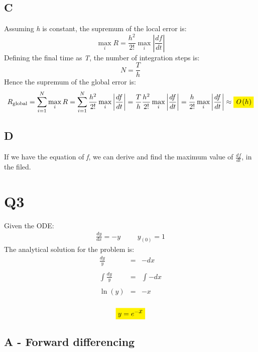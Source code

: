 \documentclass[11pt, a4paper]{article}
\begin{document}
\subsection{C}
Assuming \emph{h} is constant, the supremum of the local error is:
\begin{equation*}
    \max_i{R}=\frac{h^2}{2!}\max_i{\left|\frac{df}{dt}\right|}
\end{equation*}
Defining the final time as \emph{T}, the number of integration steps is:
\begin{equation}
    N=\frac{T}{h}
\end{equation}
Hence the supremum of the global error is:
\begin{equation}
    R_\text{global}=\sum_{i=1}^{N}\max_i{R}=\sum_{i=1}^{N}\frac{h^2}{2!}\max_i{\left|\frac{df}{dt}\right|}=\frac{T}{h}\frac{h^2}{2!}\max_i{\left|\frac{df}{dt}\right|}=\frac{h}{2!}\max_i{\left|\frac{df}{dt}\right|}\approx\colorbox{yellow}{$\emph{O}\left(h\right)$}
\end{equation}

\subsection{D}
If we have the equation of \emph{f}, we can derive and find the maximum value of $\displaystyle\frac{df}{dt}$, in the filed.

\newpage
\section{Q3}
Given the ODE:
\begin{equation}
    \begin{matrix}
        \displaystyle\frac{dy}{dx}=-y &&& y_{\left(0\right)}=1
    \end{matrix}
\end{equation}
The analytical solution for the problem is:
\begin{equation}
    \begin{array}{rcr}
        \displaystyle\frac{dy}{y} & = & -dx \\\\
        \displaystyle\int\frac{dy}{y} & = & \int-dx \\\\
        \displaystyle\ln\left(y\right) & = & -x \\\\
    \end{array}
\end{equation}
\begin{equation}
    \colorbox{yellow}{$y=\displaystyle e^{-\displaystyle x}$}
\end{equation}

\subsection{A - Forward differencing}
\end{document}
